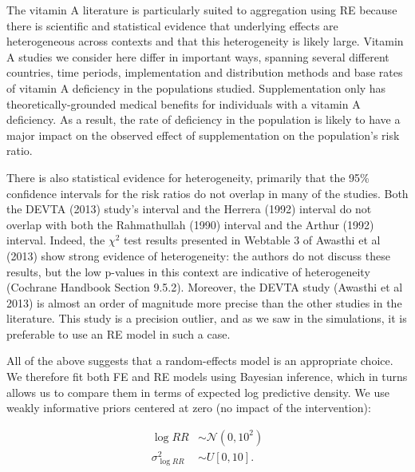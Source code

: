 \documentclass[12pt]{article}
\begin{document}
The vitamin A literature is particularly suited to aggregation using RE because there is scientific and statistical evidence that underlying effects are heterogeneous across contexts and that this heterogeneity is likely large. Vitamin A studies we consider here differ in important ways, spanning several different countries, time periods, implementation and distribution methods and base rates of vitamin A deficiency in the populations studied. Supplementation only has theoretically-grounded medical benefits for individuals with a vitamin A deficiency. As a result, the rate of deficiency in the population is likely to have a major impact on the observed effect of supplementation on the population's risk ratio. 

There is also statistical evidence for heterogeneity, primarily that the 95\% confidence intervals for the risk ratios do not overlap in many of the studies. Both the DEVTA (2013) study's interval and the Herrera (1992) interval do not overlap with both the Rahmathullah (1990) interval and the Arthur (1992) interval. Indeed, the $\chi^2$ test results presented in Webtable 3 of Awasthi et al (2013) show strong evidence of heterogeneity: the authors do not discuss these results, but the low p-values in this context are indicative of heterogeneity (Cochrane Handbook Section 9.5.2). Moreover, the DEVTA study (Awasthi et al 2013) is almost an order of magnitude more precise than the other studies in the literature. This study is a precision outlier, and as we saw in the simulations, it is preferable to use an RE model in such a case.

All of the above suggests that a random-effects model is an appropriate choice. We therefore fit both FE and RE models using Bayesian inference, which in turns allows us to compare them in terms of expected log predictive density. We use weakly informative priors centered at zero (no impact of the intervention):

\begin{equation} \label{lognormal priors}
\begin{aligned}
\log{RR} &\sim  \mathcal{N}(0,10^2) \\
\sigma^2_{\log{RR}} &\sim U[0,10].
\end{aligned}
\end{equation}



\end{document}
